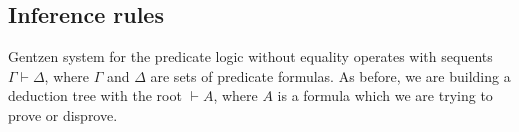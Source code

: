\subsection{Inference rules}
Gentzen system for the predicate logic without equality operates with sequents $\Gamma \vdash \Delta$,
where $\Gamma$ and $\Delta$ are sets of predicate formulas.
As before, we are building a deduction tree with the root $\vdash A$,
where $A$ is a formula which we are trying to prove or disprove.
